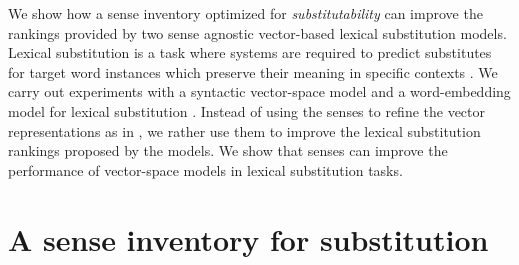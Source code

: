 \documentclass[11pt]{article}
\begin{document}
We show how a sense inventory optimized for \textit{substitutability} can improve the rankings provided by two sense agnostic vector-based lexical substitution models. 
Lexical substitution is a task where systems are required to predict substitutes  for target word instances which preserve their meaning in specific contexts \cite{mccarthy-navigli:07}. We carry out experiments with a syntactic vector-space model \cite{apidianaki:2016:EMNLP2016} and a word-embedding model  for lexical substitution \cite{melamud-levy-dagan:2015:VSM-NLP}. %
Instead of using the senses to refine the vector representations as in \cite{faruqui-EtAl:2015:NAACL-HLT}, we rather use them to improve the lexical substitution rankings proposed by the models. We show that senses can improve the performance of vector-space models in lexical substitution tasks.



\section{A sense inventory for substitution}
\end{document}
